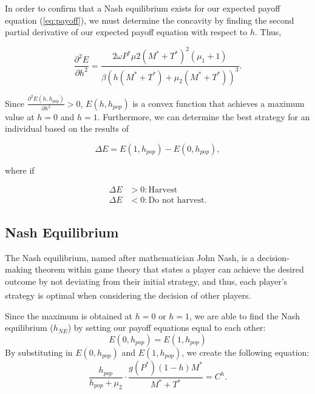 \documentclass[12pt]{article}
\begin{document}
In order to confirm that a Nash equilibrium exists for our expected payoff equation (\ref{eq:payoff}), we must determine the concavity by finding the second partial derivative of our expected payoff equation with respect to $h$. Thus, 

\begin{equation*}
    \displaystyle {\frac{\partial ^ {2} E}{\partial h^{2}} = \frac{2 \omega P^{*} \mu{2} (M^{*}+T^{*})^{2} (\mu_{1} +1)}{\beta(h(M^{*}+T^{*}) + \mu_{2}(M^{*}+T^{*}))^{3}}}.
    \label{eq:nash_partial_deriv}
\end{equation*}

Since $\frac{\partial^{2}E(h, h_{pop})}{\partial h^{2}} > 0$, $E(h, h_{pop})$ is a convex function that achieves a maximum value at $h=0$ and $h=1$. Furthermore, we can determine the best strategy for an individual based on the results of

\begin{equation*}
    \Delta E = E(1, h_{pop}) - E(0, h_{pop}),
\end{equation*}

where if

\begin{align*}
    \Delta E &> 0: \text{Harvest} \\
    \Delta E &< 0: \text{Do not harvest}.
\end{align*}


\subsection{Nash Equilibrium}
The Nash equilibrium, named after mathematician John Nash, is a decision-making theorem within game theory that states a player can achieve the desired outcome by not deviating from their initial strategy, and thus, each player's strategy is optimal when considering the decision of other players\textsuperscript{\cite{nash_definition}}. \par

Since the maximum is obtained at $h=0$ or $h=1$, we are able to find the Nash equilibrium ($h_{NE}$) by setting our payoff equations equal to each other:
\begin{equation*}
    E(0, h_{pop}) = E(1, h_{pop})
\end{equation*}
By substituting in $E(0, h_{pop})$ and $E(1, h_{pop})$, we create the following equation:
\begin{equation*}\label{eq:unsimplified_nash}
    \frac{h_{pop}}{h_{pop} + \mu_{2}} \cdot \frac{g(P^{*})(1-h)M^{*}}{M^{*} + T^{*}} = C^{h}.
\end{equation*}
\end{document}
